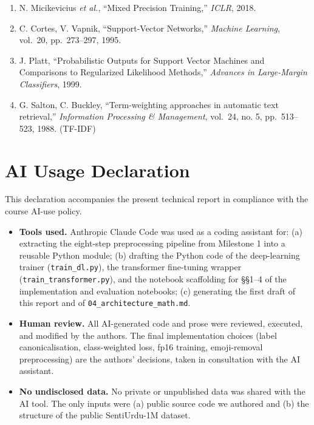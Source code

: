 \documentclass[
  english,
  11pt,
]{article}
\providecommand{\tightlist}{%
  \setlength{\itemsep}{0pt}\setlength{\parskip}{0pt}}
\begin{document}
\begin{enumerate}
  D. P. Kingma, J. Ba, ``Adam: A Method for Stochastic Optimization,''
  \emph{ICLR}, 2015.
\item
  N. Micikevicius \emph{et al.}, ``Mixed Precision Training,''
  \emph{ICLR}, 2018.
\item
  C. Cortes, V. Vapnik, ``Support-Vector Networks,'' \emph{Machine
  Learning}, vol.~20, pp.~273--297, 1995.
\item
  J. Platt, ``Probabilistic Outputs for Support Vector Machines and
  Comparisons to Regularized Likelihood Methods,'' \emph{Advances in
  Large-Margin Classifiers}, 1999.
\item
  G. Salton, C. Buckley, ``Term-weighting approaches in automatic text
  retrieval,'' \emph{Information Processing \& Management}, vol.~24, no.
  5, pp.~513--523, 1988. (TF-IDF)
\end{enumerate}

\section{AI Usage Declaration}\label{ai-usage-declaration}

This declaration accompanies the present technical report in compliance
with the course AI-use policy.

\begin{itemize}
\tightlist
\item
  \textbf{Tools used.} Anthropic Claude Code was used as a coding
  assistant for: (a) extracting the eight-step preprocessing pipeline
  from Milestone 1 into a reusable Python module; (b) drafting the
  Python code of the deep-learning trainer (\texttt{train\_dl.py}), the
  transformer fine-tuning wrapper (\texttt{train\_transformer.py}), and
  the notebook scaffolding for §§1--4 of the implementation and
  evaluation notebooks; (c) generating the first draft of this report
  and of \texttt{04\_architecture\_math.md}.
\item
  \textbf{Human review.} All AI-generated code and prose were reviewed,
  executed, and modified by the authors. The final implementation
  choices (label canonicalisation, class-weighted loss, fp16 training,
  emoji-removal preprocessing) are the authors' decisions, taken in
  consultation with the AI assistant.
\item
  \textbf{No undisclosed data.} No private or unpublished data was
  shared with the AI tool. The only inputs were (a) public source code
  we authored and (b) the structure of the public SentiUrdu-1M dataset.
\end{itemize}
\end{document}
